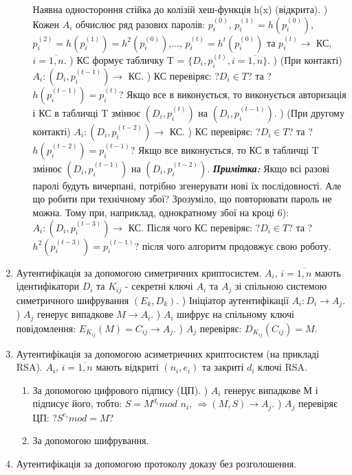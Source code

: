 \begin{enumerate}
\begin{enumerate}
    \newline Наявна одностороння стійка до колізій хеш-функція h(x) (відкрита).
    ) Кожен $A_{i}$ обчислює ряд разових паролів: $p_{i}^{(0)}$, $p_{i}^{(1)} = h(p_{i}^{(0)})$, $p_{i}^{(2)} = h(p_{i}^{(1)}) = h^{2}(p_{i}^{(0)})$,..., $p_{i}^{(t)} = h^{t}(p_{i}^{(0)})$ та $p_{i}^{(t)} \rightarrow $ КС, $i = \overline{1,n}$.
    ) КС формує табличку T = $\{D_{i}, p_{i}^{(t)}, i = \overline{1,n}\}$.
    ) (При контакті) $A_{i}: (D_{i}, p_{i}^{(t-1)}) \rightarrow $ КС.
    ) КС перевіряє: ?$D_{i} \in T$? та ?$h(p_{i}^{(t-1)}) = p_{i}^{(t)}$?
    \newline Якщо все в виконується, то виконується авторизація і КС в табличці T змінює $(D_{i}, p_{i}^{(t)})$ на $(D_{i}, p_{i}^{(t-1)})$.
    ) (При другому контакті) $A_{i}: (D_{i}, p_{i}^{(t-2)}) \rightarrow $ КС.
    ) КС перевіряє: ?$D_{i} \in T$? та ?$h(p_{i}^{(t-2)}) = p_{i}^{(t-1)}$? 
    \newline Якщо все виконується, то КС в табличці T змінює $(D_{i}, p_{i}^{(t-1)})$ на $(D_{i}, p_{i}^{(t-2)})$.
    \newline \textbf{\textit{Примітка:}} Якщо всі разові паролі будуть вичерпані, потрібно згенерувати нові їх послідовності.
    \newline Але що робити при технічному збої? Зрозуміло, що повторювати пароль не можна. Тому при, наприклад, однократному збої на кроці 6):
    $A_{i}: (D_{i}, p_{i}^{(t-3)}) \rightarrow $ КС. Після чого КС перевіряє: ?$D_{i} \in T$? та ?$h^{2}(p_{i}^{(t-3)}) = p_{i}^{(t-1)}$? після чого алгоритм продовжує свою роботу.
 \end{enumerate} 
 \item Аутентифікація за допомогою симетричних криптосистем.
   $A_{i}$, $i = \overline{1,n}$ мають ідентифікатори $D_{i}$ та $K_{ij}$ - секретні ключі $A_{i}$ та $A_{j}$ зі спільною системою симетричного шифрування $(E_{k}, D_{k})$.
  ) Ініціатор аутентифікації $A_{i}: D_{i} \rightarrow A_{j}$.
  ) $A_{j}$ генерує випадкове $M \rightarrow A_{i}$.
  ) $A_{i}$ шифрує на спільному ключі повідомлення: $E_{K_{ij}}(M) = C_{ij} \rightarrow A_{j}$.
  ) $A_{j}$ перевіряє: $D_{K_{ij}}(C_{ij}) = M$.
 \item Аутентифікація за допомогою асиметричних криптосистем (на прикладі RSA).
   $A_{i}$, $i = \overline{1,n}$ мають відкриті $(n_{i}, e_{i})$ та закриті $d_{i}$ ключі RSA.
  \begin{enumerate}
   \item За допомогою цифрового підпису (ЦП).
   ) $A_{i}$ генерує випадкове М і підписує його, тобто:
   \newline $S = M^{d_{i}}mod$ $n_{i}$, $\Rightarrow  (M, S) \rightarrow A_{j}$.
   ) $A_{j}$ перевіряє ЦП: ?$S^{e_{i}}mod = M$?
   \item За допомогою шифрування.
  \end{enumerate}
 \item Аутентифікація за допомогою протоколу доказу без розголошення.
 \end{enumerate}